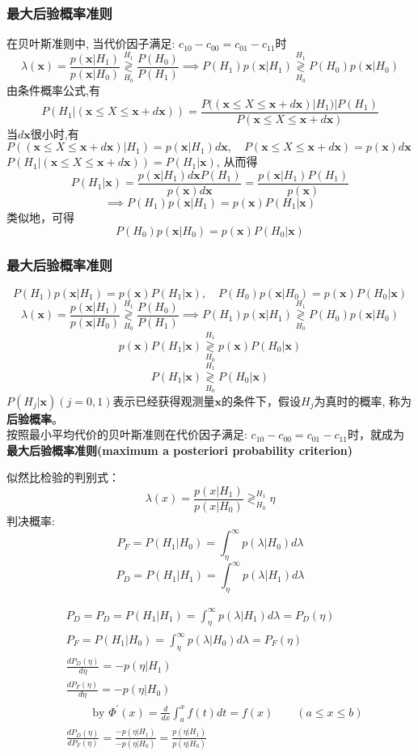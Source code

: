 \begin{frame}[shrink]
\frametitle{最大后验概率准则}
在贝叶斯准则中, 当代价因子满足: $c_{10}-c_{00}=c_{01}-c_{11}$时 
\[\lambda(\bm{x})=\frac{p(\bm{x}|H_1)}{p(\bm{x}|H_0)}\mathop{\gtrless}\limits_{H_0}^{H_1}\frac{P(H_0)}{P(H_1)}\implies P(H_1)p(\bm{x}|H_1)\mathop{\gtrless}\limits_{H_0}^{H_1}P(H_0)p(\bm{x}|H_0)\]
由条件概率公式,有
\[P(H_1|(\bm{x}\le X\le \bm{x}+d\bm{x}))=\frac{P((\bm{x}\le X\le \bm{x}+d\bm{x})|H_1)|P(H_1)}{P(\bm{x}\le X\le \bm{x}+d\bm{x})}\]
当$d\bm{x}$很小时,有$P((\bm{x}\le X\le \bm{x}+d\bm{x})|H_1)=p(\bm{x}|H_1)d\bm{x},\quad P(\bm{x}\le X\le \bm{x}+d\bm{x})=p(\bm{x})d\bm{x}$\\
$P(H_1|(\bm{x}\le X\le \bm{x}+d\bm{x}))=P(H_1|\bm{x})$, 从而得
\[P(H_1|\bm{x})=\frac{p(\bm{x}|H_1)d\bm{x}P(H_1)}{p(\bm{x})d\bm{x}}=\frac{p(\bm{x}|H_1)P(H_1)}{p(\bm{x})}\]
\[\implies P(H_1)p(\bm{x}|H_1)=p(\bm{x})P(H_1|\bm{x}) \]
类似地，可得
\[P(H_0)p(\bm{x}|H_0)=p(\bm{x})P(H_0|\bm{x}) \]
\end{frame}

\begin{frame}[shrink]
\frametitle{最大后验概率准则}
\[P(H_1)p(\bm{x}|H_1)=p(\bm{x})P(H_1|\bm{x}),\quad P(H_0)p(\bm{x}|H_0)=p(\bm{x})P(H_0|\bm{x}) \]
\[\lambda(\bm{x})=\frac{p(\bm{x}|H_1)}{p(\bm{x}|H_0)}\mathop{\gtrless}\limits_{H_0}^{H_1}\frac{P(H_0)}{P(H_1)}\implies P(H_1)p(\bm{x}|H_1)\mathop{\gtrless}\limits_{H_0}^{H_1}P(H_0)p(\bm{x}|H_0)\]
\[p(\bm{x})P(H_1|\bm{x})\mathop{\gtrless}\limits_{H_0}^{H_1}p(\bm{x})P(H_0|\bm{x}) \]
\[P(H_1|\bm{x})\mathop{\gtrless}\limits_{H_0}^{H_1}P(H_0|\bm{x}) \]
$P(H_j|\bm{x})(j=0,1)$表示已经获得观测量$\bm{x}$的条件下，假设$H_j$为真时的概率, 称为\textbf{后验概率}。\\
按照最小平均代价的贝叶斯准则在代价因子满足: $c_{10}-c_{00}=c_{01}-c_{11}$时，就成为\textbf{最大后验概率准则(maximum a posteriori probability criterion)} 
\end{frame}

\begin{frame}
似然比检验的判别式：
\[\lambda(x)=\frac{p(x|H_1)}{p(x|H_0)}\mathop{\gtrless}_{H_0}^{H_1}\eta \]
判决概率:
\[P_F=P(H_1|H_0)=\int_{\eta}^{\infty}p(\lambda|H_0)d\lambda \]
\[P_D=P(H_1|H_1)=\int_{\eta}^{\infty}p(\lambda|H_1)d\lambda \]
\end{frame}

\begin{frame}
\begin{align*}
&P_D =P_D=P(H_1|H_1)=\int_{\eta}^{\infty}p(\lambda|H_1)d\lambda=P_D(\eta) \\
&P_F =P(H_1|H_0)=\int_{\eta}^{\infty}p(\lambda|H_0)d\lambda=P_F(\eta) \\
&\frac{dP_D(\eta)}{d\eta} =-p(\eta|H_1) \\ 
&\frac{dP_F(\eta)}{d\eta} =-p(\eta|H_0) \\ 
&\qquad \text{ by } \Phi^\prime(x)=\frac{d}{dx}\int_a^xf(t)dt=f(x)\qquad (a\le x\le b) \\
&\frac{dP_D(\eta)}{dP_F(\eta)} =\frac{-p(\eta|H_1)}{-p(\eta|H_0)}=\frac{p(\eta|H_1)}{p(\eta|H_0)}\\
\end{align*}
\end{frame}

